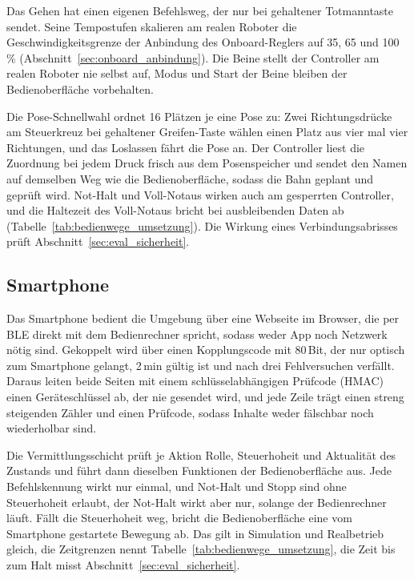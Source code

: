 Das Gehen hat einen eigenen Befehlsweg, der nur bei gehaltener Totmanntaste sendet.
Seine Tempostufen skalieren am realen Roboter die Geschwindigkeitsgrenze der Anbindung des Onboard-Reglers auf 35, 65 und 100\,\% (Abschnitt~\ref{sec:onboard_anbindung}).
Die Beine stellt der Controller am realen Roboter nie selbst auf, Modus und Start der Beine bleiben der Bedienoberfläche vorbehalten.

Die Pose-Schnellwahl ordnet 16 Plätzen je eine Pose zu: Zwei Richtungsdrücke am Steuerkreuz bei gehaltener Greifen-Taste wählen einen Platz aus vier mal vier Richtungen, und das Loslassen fährt die Pose an.
Der Controller liest die Zuordnung bei jedem Druck frisch aus dem Posenspeicher und sendet den Namen auf demselben Weg wie die Bedienoberfläche, sodass die Bahn geplant und geprüft wird.
Not-Halt und Voll-Notaus wirken auch am gesperrten Controller, und die Haltezeit des Voll-Notaus bricht bei ausbleibenden Daten ab (Tabelle~\ref{tab:bedienwege_umsetzung}).
Die Wirkung eines Verbindungsabrisses prüft Abschnitt~\ref{sec:eval_sicherheit}.

\subsection{Smartphone}
\label{sec:smartphone}
Das Smartphone bedient die Umgebung über eine Webseite im Browser, die per \ac{BLE} direkt mit dem Bedienrechner spricht, sodass weder App noch Netzwerk nötig sind.
Gekoppelt wird über einen Kopplungscode mit 80\,Bit, der nur optisch zum Smartphone gelangt, 2\,min gültig ist und nach drei Fehlversuchen verfällt.
Daraus leiten beide Seiten mit einem schlüsselabhängigen Prüfcode (\ac{HMAC}) einen Geräteschlüssel ab, der nie gesendet wird, und jede Zeile trägt einen streng steigenden Zähler und einen Prüfcode, sodass Inhalte weder fälschbar noch wiederholbar sind.

Die Vermittlungsschicht prüft je Aktion Rolle, Steuerhoheit und Aktualität des Zustands und führt dann dieselben Funktionen der Bedienoberfläche aus.
Jede Befehlskennung wirkt nur einmal, und Not-Halt und Stopp sind ohne Steuerhoheit erlaubt, der Not-Halt wirkt aber nur, solange der Bedienrechner läuft.
Fällt die Steuerhoheit weg, bricht die Bedienoberfläche eine vom Smartphone gestartete Bewegung ab.
Das gilt in Simulation und Realbetrieb gleich, die Zeitgrenzen nennt Tabelle~\ref{tab:bedienwege_umsetzung}, die Zeit bis zum Halt misst Abschnitt~\ref{sec:eval_sicherheit}.

